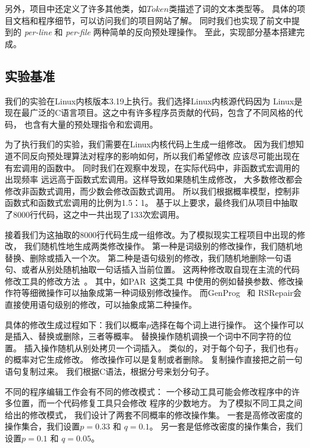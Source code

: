 另外，项目中还定义了许多其他类，如$Token$类描述了词的文本类型等。
具体的项目文档和程序细节，可以访问我们的项目网站了解。
同时我们也实现了前文中提到的 \emph{per-line} 和 \emph{per-file}
两种简单的反向预处理操作。
至此，实现部分基本搭建完成。


\subsection{实验基准}
我们的实验在Linux内核版本3.19上执行。我们选择Linux内核源代码因为
Linux是现在最广泛的C语言项目。这之中有许多程序员贡献的代码，包含了不同风格的代码，
也含有大量的预处理指令和宏调用。

为了执行我们的实验，我们需要在Linux内核代码上生成一组修改。
因为我们想知道不同反向预处理算法对程序的影响如何，所以我们希望修改
应该尽可能出现在有宏调用的函数中。
同时我们在观察中发现，在实际代码中，非函数式宏调用的出现频率
远远高于函数式宏调用。这样导致如果随机生成修改，
大多数修改都会修改非函数式调用，而少数会修改函数式调用。
所以我们根据概率模型，控制非函数式和函数式宏调用的比例为1.5：1。
基于以上要求，最终我们从项目中抽取了8000行代码，这之中一共出现了133次宏调用。

接着我们为这抽取的8000行代码生成一组修改。为了模拟现实工程项目中出现的修改，
我们随机性地生成两类修改操作。
第一种是词级别的修改操作，我们随机地替换、删除或插入一个次。
第二种是语句级别的修改，我们随机地删除一句语句、或者从别处随机抽取一句话插入当前位置。
这两种修改取自现在主流的代码修改工具的修改方法~\parencite{le2012genprog,QiMLDW14,kim2013automatic}。
其中，如PAR~\parencite{kim2013automatic}这类工具
中使用的例如替换参数、修改操作符等细微操作可以抽象成第一种词级别修改操作。
而GenProg~\parencite{le2012genprog} 和
RSRepair\parencite{QiMLDW14}会直接使用语句级别的修改，可以抽象成第二种操作。

具体的修改生成过程如下：我们以概率$p$选择在每个词上进行操作。
这个操作可以是插入、替换或删除，三者等概率。
替换操作随机调换一个词中不同字符的位置。
插入操作随机从别处拷贝一个词插入。
类似的，对于每个句子，我们也有$q$的概率对它生成修改。
修改操作可以是复制或者删除。
复制操作直接把之前一句语句复制过来。
我们根据C语法，根据分号来划分句子。

不同的程序编辑工作会有不同的修改模式：
一个移动工具可能会修改程序中的许多位置，而一个代码修复工具只会修改
程序的少数地方。
为了模拟不同工具之间给出的修改模式，
我们设计了两套不同概率的修改操作集。
一套是高修改密度的操作集合，我们设置$p=0.33$ 和 $q=0.1$。
另一套是低修改密度的操作集合，我们设置$p=0.1$ 和 $q=0.05$。

